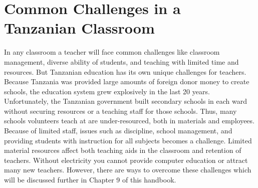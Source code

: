 \section{Common Challenges in a Tanzanian Classroom}
In any classroom a teacher will face common challenges like classroom management, diverse ability of students, and teaching with limited time and resources.  But Tanzanian education has its own unique challenges for teachers.  Because Tanzania was provided large amounts of foreign donor money to create schools, the education system grew explosively in the last 20 years.  Unfortunately, the Tanzanian government built secondary schools in each ward without securing resources or a teaching staff for those schools.  Thus, many schools volunteers teach at are under-resourced, both in materials and employees.  Because of limited staff, issues such as discipline, school management, and providing students with instruction for all subjects becomes a challenge.   Limited material resources affect both teaching aids in the classroom and retention of teachers.  Without electricity you cannot provide computer education or attract many new teachers.  However, there are ways to overcome these challenges which will be discussed further in Chapter 9 of this handbook.

\begin{center}
\setlength\fboxsep{0pt}
\setlength\fboxrule{2pt}
\end{center}

